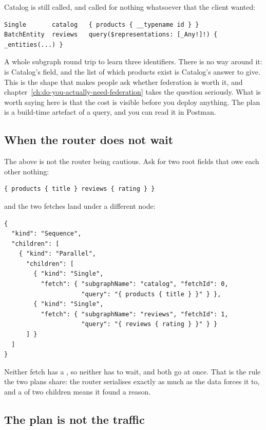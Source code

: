 Catalog is still called, and called for nothing whatsoever that the client
wanted:

\begin{verbatim}
Single       catalog   { products { __typename id } }
BatchEntity  reviews   query($representations: [_Any!]!) { _entities(...) }
\end{verbatim}

A whole subgraph round trip to learn three identifiers. There is no way around
it:  is Catalog's field, and the list of which products exist is
Catalog's answer to give. This is the shape that makes people ask whether
federation is worth it, and
chapter~\ref{ch:do-you-actually-need-federation} takes the question seriously.
What is worth saying here is that the cost is visible before you deploy
anything. The plan is a build-time artefact of a query, and you can read it in
Postman.

\subsection*{When the router does not wait}

%
The  above is not the router being cautious. Ask for two root
fields that owe each other nothing:

\begin{verbatim}
{ products { title } reviews { rating } }
\end{verbatim}

and the two fetches land under a different node:

\begin{verbatim}
{
  "kind": "Sequence",
  "children": [
    { "kind": "Parallel",
      "children": [
        { "kind": "Single",
          "fetch": { "subgraphName": "catalog", "fetchId": 0,
                     "query": "{ products { title } }" } },
        { "kind": "Single",
          "fetch": { "subgraphName": "reviews", "fetchId": 1,
                     "query": "{ reviews { rating } }" } }
      ] }
  ]
}
\end{verbatim}

Neither fetch has a , so neither has to wait, and both
go at once. That is the rule the two plans share: the router serialises exactly
as much as the data forces it to, and a  of two children means it
found a reason.

\subsection*{The plan is not the traffic}

